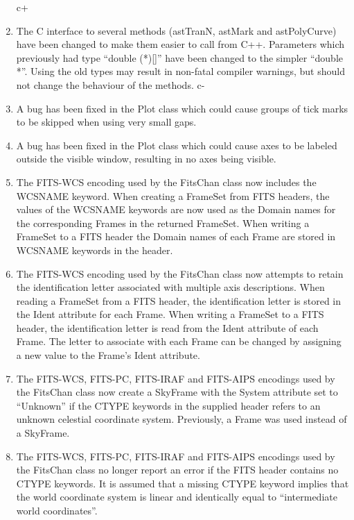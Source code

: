 \documentclass[twoside,11pt]{article}
\begin{document}
\begin{enumerate}

c+
\item The C interface to several methods (astTranN, astMark and
astPolyCurve) have been changed to make them easier to call from C++.
Parameters which previously had type ``double (*)[]'' have been changed
to the simpler ``double *''. Using the old types may result in non-fatal
compiler warnings, but should not change the behaviour of the methods.
c-

\item A bug has been fixed in the Plot class which could cause groups 
of tick marks to be skipped when using very small gaps.

\item A bug has been fixed in the Plot class which could cause axes to be
labeled outside the visible window, resulting in no axes being visible.

\item The FITS-WCS encoding used by the FitsChan class now includes the
WCSNAME keyword. When creating a FrameSet from FITS headers, the values of 
the WCSNAME keywords are now used as the Domain names for the corresponding 
Frames in the returned FrameSet. When writing a FrameSet to a FITS header
the Domain names of each Frame are stored in WCSNAME keywords in the
header. 

\item The FITS-WCS encoding used by the FitsChan class now attempts to
retain the identification letter associated with multiple axis
descriptions. When reading a FrameSet from a FITS header, the identification 
letter is stored in the Ident attribute for each Frame. When writing a
FrameSet to a FITS header, the identification letter is read from the
Ident attribute of each Frame. The letter to associate with each Frame
can be changed by assigning a new value to the Frame's Ident attribute.

\item The FITS-WCS, FITS-PC, FITS-IRAF and FITS-AIPS encodings used by the 
FitsChan class now create a SkyFrame with the System attribute set to 
``Unknown'' if the CTYPE keywords in the supplied header refers to an
unknown celestial coordinate system. Previously, a Frame was used instead
of a SkyFrame.

\item The FITS-WCS, FITS-PC, FITS-IRAF and FITS-AIPS encodings used by the 
FitsChan class no longer report an error if the FITS header contains no
CTYPE keywords. It is assumed that a missing CTYPE keyword implies that 
the world coordinate system is linear and identically equal to
``intermediate world coordinates''.


\end{enumerate}
\end{document}
